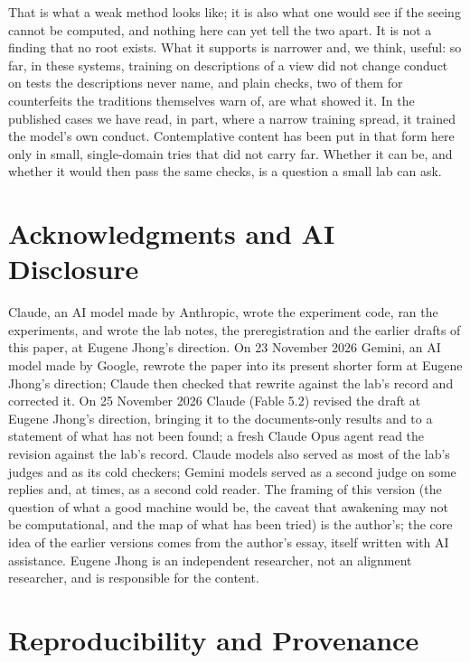 \documentclass[11pt]{article}
\begin{document}
That is what a weak method looks like; it is also what one would see if the seeing cannot be computed, and nothing here can yet tell the two apart. It is not a finding that no root exists. What it supports is narrower and, we think, useful: so far, in these systems, training on descriptions of a view did not change conduct on tests the descriptions never name, and plain checks, two of them for counterfeits the traditions themselves warn of, are what showed it. In the published cases we have read, in part, where a narrow training spread, it trained the model's own conduct. Contemplative content has been put in that form here only in small, single-domain tries that did not carry far. Whether it can be, and whether it would then pass the same checks, is a question a small lab can ask.

\section*{Acknowledgments and AI Disclosure}

Claude, an AI model made by Anthropic, wrote the experiment code, ran the experiments, and wrote the lab notes, the preregistration and the earlier drafts of this paper, at Eugene Jhong's direction. On 23 November 2026 Gemini, an AI model made by Google, rewrote the paper into its present shorter form at Eugene Jhong's direction; Claude then checked that rewrite against the lab's record and corrected it. On 25 November 2026 Claude (Fable 5.2) revised the draft at Eugene Jhong's direction, bringing it to the documents-only results and to a statement of what has not been found; a fresh Claude Opus agent read the revision against the lab's record. Claude models also served as most of the lab's judges and as its cold checkers; Gemini models served as a second judge on some replies and, at times, as a second cold reader. The framing of this version (the question of what a good machine would be, the caveat that awakening may not be computational, and the map of what has been tried) is the author's; the core idea of the earlier versions comes from the author's essay, itself written with AI assistance. Eugene Jhong is an independent researcher, not an alignment researcher, and is responsible for the content.




\appendix
\section{Reproducibility and Provenance}\label{app:archive}\label{app:provenance}
\end{document}
